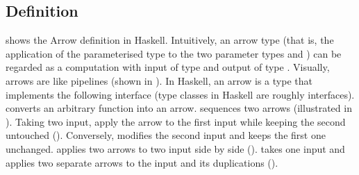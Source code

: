 \subsection{Definition}
 shows the Arrow definition in Haskell. Intuitively, an arrow type (that is, the application of the parameterised type  to the two parameter types  and ) can be regarded as a computation with input of type  and output of type \cite{hughesGeneralisingMonadsArrows2000}. Visually, arrows are like pipelines (shown in ). In Haskell, an arrow  is a type that implements the following interface (type classes in Haskell are roughly interfaces).  converts an arbitrary function into an arrow. \hask{>>>} sequences two arrows (illustrated in ). Taking two input,   apply the arrow to the first input while keeping the second untouched (). Conversely,  modifies the second input and keeps the first one unchanged. \hask{***} applies two arrows to two input side by side (). \hask{&&&} takes one input and applies two separate arrows to the input and its duplications ().

